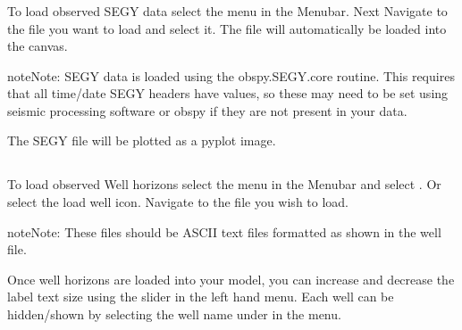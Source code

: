 \documentclass[a4paper,10pt,english]{sphinxmanual}
\begin{document}
\subsubsection{}
\label{\detokenize{manual_segy:loading-segy-data}}
To load observed SEGY data select the  menu in the Menubar.
Next Navigate to the file you want to load and select it.
The file will automatically be loaded into the canvas.

\begin{sphinxadmonition}{note}{Note:}
SEGY data is loaded using the obspy.SEGY.core routine. This requires that all time/date SEGY headers have values,
so these may need to be set using seismic processing software or obspy if they are not present in your data.

The SEGY file will be plotted as a pyplot image.
\end{sphinxadmonition}


\subsection{}
\label{\detokenize{manual_wells:well-data}}\label{\detokenize{manual_wells::doc}}

\subsubsection{}
\label{\detokenize{manual_wells:loading-well-data}}
To load observed Well horizons select the  menu in the Menubar and select . Or select the load well icon.
Navigate to the file you wish to load.

\begin{sphinxadmonition}{note}{Note:}
These files should be ASCII text files formatted as shown in the  well file.
\end{sphinxadmonition}

Once well horizons are loaded into your model, you can increase and decrease the label text size using the slider in the
left hand menu. Each well can be hidden/shown by selecting the well name under  in the  menu.


\subsection{}
\label{\detokenize{manual_XY_data::doc}}\label{\detokenize{manual_XY_data:xy-data}}
\end{document}
